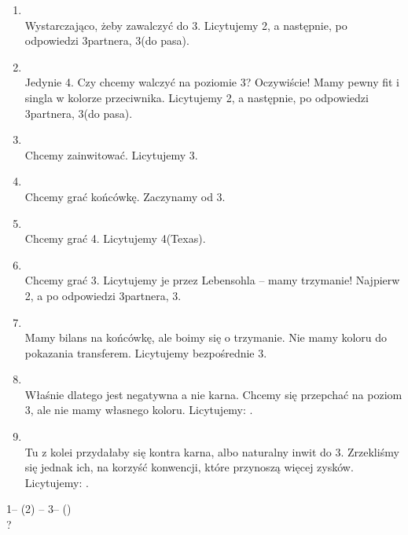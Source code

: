 \documentclass[12pt, a4paper]{article}
\begin{document}
\begin{enumerate}
    \item
        \\
        Wystarczająco, żeby zawalczyć do 3\hearts.
        Licytujemy 2\nt, a następnie, po odpowiedzi 3\clubs partnera, 3\hearts (do pasa).
    \item
        \\
        Jedynie 4\hcp. Czy chcemy walczyć na poziomie 3? Oczywiście!
        Mamy pewny fit i singla w kolorze przeciwnika.
        Licytujemy 2\nt, a następnie, po odpowiedzi 3\clubs partnera, 3\hearts (do pasa).
    \item 
        \\
        Chcemy zainwitować. Licytujemy 3\diams.
    \item 
        \\
        Chcemy grać końcówkę. Zaczynamy od 3\diams.
    \item 
        \\
        Chcemy grać 4\hearts. Licytujemy 4\diams (Texas).
    \item 
        \\
        Chcemy grać 3\nt. Licytujemy je przez Lebensohla -- mamy trzymanie!
        Najpierw 2\nt, a po odpowiedzi 3\clubs partnera, 3\nt.
    \item 
        \\
        Mamy bilans na końcówkę, ale boimy się o trzymanie.
        Nie mamy koloru do pokazania transferem. Licytujemy bezpośrednie 3\nt.
    \item
        \\
        Właśnie dlatego \dbl jest negatywna a nie karna.
        Chcemy się przepchać na poziom 3, ale nie
        mamy własnego koloru. Licytujemy: \dbl.
    \item 
        \\
        Tu z kolei przydałaby się kontra karna, albo
        naturalny inwit do 3\nt. Zrzekliśmy się jednak ich,
        na korzyść konwencji, które przynoszą więcej zysków.
        Licytujemy: \pass.
\end{enumerate}

\newpage

1\nt -- (2\spades) -- 3\diams -- (\pass)\\
?
\end{document}
